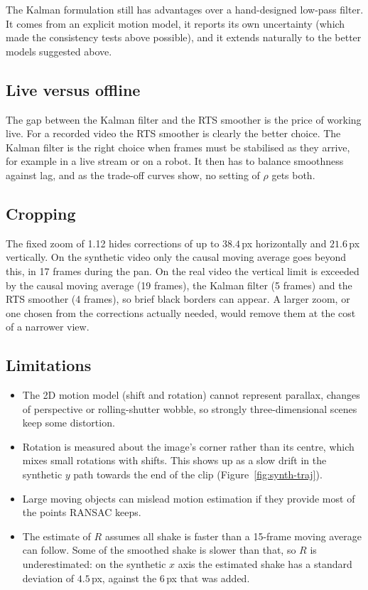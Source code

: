 \documentclass[11pt,a4paper]{article}
\begin{document}
The Kalman formulation still has advantages over a hand-designed low-pass filter. It comes from an
explicit motion model, it reports its own uncertainty (which made the consistency tests above
possible), and it extends naturally to the better models suggested above.

\subsection{Live versus offline}
The gap between the Kalman filter and the RTS smoother is the price of working live. For a
recorded video the RTS smoother is clearly the better choice. The Kalman filter is the right
choice when frames must be stabilised as they arrive, for example in a live stream or on a robot.
It then has to balance smoothness against lag, and as the trade-off curves show, no setting of
$\rho$ gets both.

\subsection{Cropping}
The fixed zoom of 1.12 hides corrections of up to $38.4$\,px horizontally and $21.6$\,px
vertically. On the synthetic video only the causal moving average goes beyond this, in 17 frames
during the pan. On the real video the vertical limit is exceeded by the causal moving average
(19 frames), the Kalman filter (5 frames) and the RTS smoother (4 frames), so brief black borders
can appear. A larger zoom, or one chosen from the corrections actually needed, would remove them
at the cost of a narrower view.

\subsection{Limitations}
\begin{itemize}
  \item The 2D motion model (shift and rotation) cannot represent parallax, changes of
        perspective or rolling-shutter wobble, so strongly three-dimensional scenes keep some
        distortion.
  \item Rotation is measured about the image's corner rather than its centre, which mixes small
        rotations with shifts. This shows up as a slow drift in the synthetic $y$ path towards
        the end of the clip (Figure~\ref{fig:synth-traj}).
  \item Large moving objects can mislead motion estimation if they provide most of the points
        RANSAC keeps.
  \item The estimate of $R$ assumes all shake is faster than a 15-frame moving average can
        follow. Some of the smoothed shake is slower than that, so $R$ is underestimated: on the
        synthetic $x$ axis the estimated shake has a standard deviation of $4.5$\,px, against the
        $6$\,px that was added.
\end{itemize}
\end{document}
